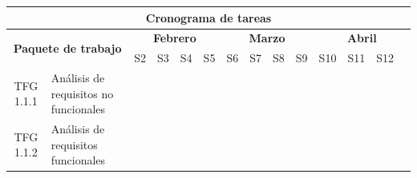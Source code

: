 \begin{table}[h!]
    \centering
    \footnotesize
    \setlength{\tabcolsep}{3pt}
    \begin{tabular}{|c|l|c|c|c|c|c|c|c|c|c|c|c|c|} %
        \hline
        \multicolumn{14}{|c|}{\textbf{Cronograma de tareas}}                                                                                                                                                                                                                                                                                                                  \\
        \hline
        \multicolumn{2}{|c|}{\multirow{2}{*}{\textbf{Paquete de trabajo}}}
                               & \multicolumn{4}{|c|}{\textbf{Febrero}}
                               & \multicolumn{4}{|c|}{\textbf{Marzo}}
                               & \multicolumn{4}{|c|}{\textbf{Abril}}                                                                                                                                                                                                                                                                                                         \\
        \cline{3-14}
        \multicolumn{2}{|c|}{} & S1                                           & S2                    & S3                    & S4                    & S5                    & S6                    & S7                    & S8                    & S9                    & S10                   & S11                   & S12                                           \\
        \hline
        TFG 1.1.1              & Análisis de requisitos no funcionales        & \cellcolor{ganttblue} & \cellcolor{ganttblue} &                       &                       &                       &                       &                       &                       &                       &                       &                       & \hspace{0pt}          \\ %
        \hline
        TFG 1.1.2              & Análisis de requisitos funcionales           & \cellcolor{ganttblue} & \cellcolor{ganttblue} &                       &                       &                       &                       &                       &                       &                       &                       &                       & \hspace{0pt}          \\

\end{tabular}
\end{table}
